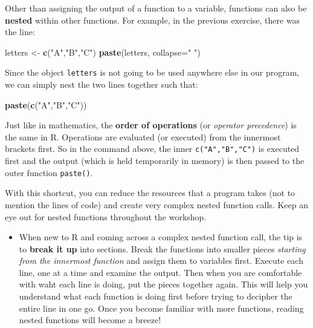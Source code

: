\documentclass[a4paper]{book}
\newenvironment{Shaded}{\begin{snugshade}}{\end{snugshade}}
\newcommand{\KeywordTok}[1]{\textcolor[rgb]{0.13,0.29,0.53}{\textbf{{#1}}}}
\newcommand{\DataTypeTok}[1]{\textcolor[rgb]{0.13,0.29,0.53}{{#1}}}
\newcommand{\StringTok}[1]{\textcolor[rgb]{0.31,0.60,0.02}{{#1}}}
\newcommand{\NormalTok}[1]{{#1}}
\renewenvironment{Shaded}
{\vspace{1.5em}\begin{leftbar}\begin{snugshade}}
{\end{snugshade}\end{leftbar}\vspace{3pt}}
\newenvironment{rmdblock}[1]
  {\vspace{1.5em}\begin{shaded*}
  \begin{itemize}
  \renewcommand{\labelitemi}{
    \raisebox{-.7\height}[0pt][0pt]{
      {\setkeys{Gin}{width=3em,keepaspectratio}\texttt{[image: images/\#1]}}
    }
  }
  \item
  }
  {
  \end{itemize}
  \end{shaded*}
  }
\newenvironment{rmdtip}
  {\begin{rmdblock}{tip}}
  {\end{rmdblock}}
\begin{document}
Other than assigning the output of a function to a variable, functions
can also be \textbf{nested} within other functions. For example, in the
previous exercise, there was the line:

\begin{Shaded}
\begin{Highlighting}[]
\NormalTok{letters <-}\StringTok{ }\KeywordTok{c}\NormalTok{(}\StringTok{"A"}\NormalTok{,}\StringTok{"B"}\NormalTok{,}\StringTok{"C"}\NormalTok{)}
\KeywordTok{paste}\NormalTok{(letters, }\DataTypeTok{collapse=}\StringTok{" "}\NormalTok{)}
\end{Highlighting}
\end{Shaded}

Since the object \texttt{letters} is not going to be used anywhere else
in our program, we can simply nest the two lines together such that:

\begin{Shaded}
\begin{Highlighting}[]
\KeywordTok{paste}\NormalTok{(}\KeywordTok{c}\NormalTok{(}\StringTok{"A"}\NormalTok{,}\StringTok{"B"}\NormalTok{,}\StringTok{"C"}\NormalTok{))}
\end{Highlighting}
\end{Shaded}

Just like in mathematics, the \textbf{order of operations} (or
\emph{operator precedence}) is the same in R. Operations are evaluated
(or executed) from the innermost brackets first. So in the command
above, the inner \texttt{c("A","B","C")} is executed first and the
output (which is held temporarily in memory) is then passed to the outer
function \texttt{paste()}.

With this shortcut, you can reduce the resources that a program takes
(not to mention the lines of code) and create very complex nested
function calls. Keep an eye out for nested functions throughout the
workshop.

\begin{rmdtip}
When new to R and coming across a complex nested function call, the tip
is to \textbf{break it up} into sections. Break the functions into
smaller pieces \emph{starting from the innermost function} and assign
them to variables first. Execute each line, one at a time and examine
the output. Then when you are comfortable with waht each line is doing,
put the pieces together again. This will help you understand what each
function is doing first before trying to decipher the entire line in one
go. Once you become familiar with more functions, reading nested
functions will become a breeze!
\end{rmdtip}
\end{document}
